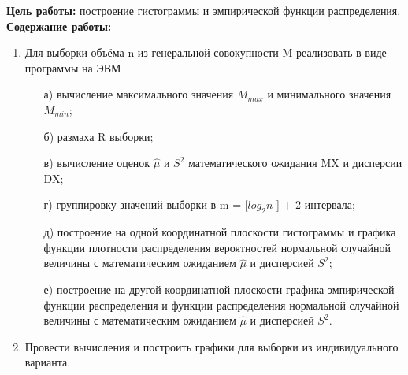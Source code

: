 \textbf{Цель работы:} построение гистограммы и эмпирической функции распределения.
\textbf{Содержание работы:}

\begin{enumerate}
\item Для выборки объёма n из генеральной совокупности M реализовать в виде программы на ЭВМ
\begin{enumerate}
\item[а)] вычисление максимального значения $M_{max}$ и минимального значения $M_{min}$;
\item[б)] размаха R выборки;
\item[в)] вычисление оценок $\hat{\mu}$ и $S^2$ математического ожидания MX и дисперсии DX;
\item[г)] группировку значений выборки в m = [$log_2n$ ] + 2 интервала;
\item[д)] построение на одной координатной плоскости гистограммы и графика функции плотности распределения вероятностей нормальной случайной величины с математическим ожиданием $\hat{\mu}$ и дисперсией $S^2$;
\item[е)] построение на другой координатной плоскости графика эмпирической
функции распределения и функции распределения нормальной случайной величины с математическим ожиданием $\hat{\mu}$ и дисперсией $S^2$.
\end{enumerate}
\item Провести вычисления и построить графики для выборки из индивидуального варианта.

\end{enumerate}